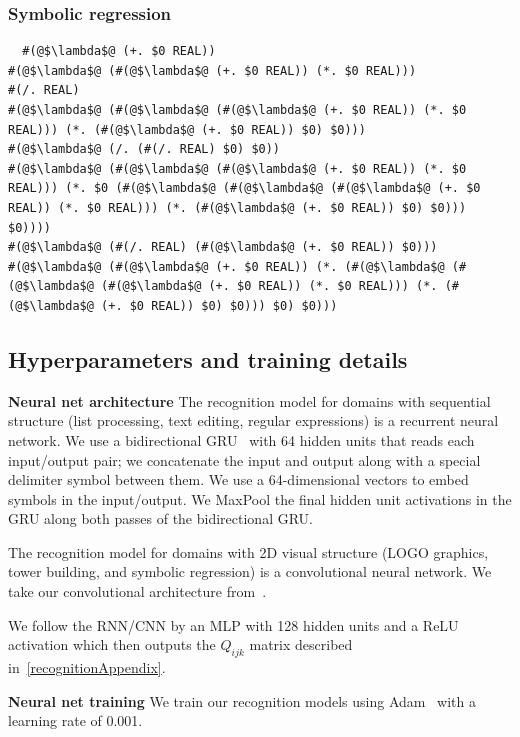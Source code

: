 \documentclass{article}
\begin{document}
\subsubsection{Symbolic regression}
\begin{lstlisting}
  #(@$\lambda$@ (+. $0 REAL))
#(@$\lambda$@ (#(@$\lambda$@ (+. $0 REAL)) (*. $0 REAL)))
#(/. REAL)
#(@$\lambda$@ (#(@$\lambda$@ (#(@$\lambda$@ (+. $0 REAL)) (*. $0 REAL))) (*. (#(@$\lambda$@ (+. $0 REAL)) $0) $0)))
#(@$\lambda$@ (/. (#(/. REAL) $0) $0))
#(@$\lambda$@ (#(@$\lambda$@ (#(@$\lambda$@ (+. $0 REAL)) (*. $0 REAL))) (*. $0 (#(@$\lambda$@ (#(@$\lambda$@ (#(@$\lambda$@ (+. $0 REAL)) (*. $0 REAL))) (*. (#(@$\lambda$@ (+. $0 REAL)) $0) $0))) $0))))
#(@$\lambda$@ (#(/. REAL) (#(@$\lambda$@ (+. $0 REAL)) $0)))
#(@$\lambda$@ (#(@$\lambda$@ (+. $0 REAL)) (*. (#(@$\lambda$@ (#(@$\lambda$@ (#(@$\lambda$@ (+. $0 REAL)) (*. $0 REAL))) (*. (#(@$\lambda$@ (+. $0 REAL)) $0) $0))) $0) $0)))
\end{lstlisting}

\subsection{Hyperparameters and training details}

\noindent\textbf{Neural net architecture} The recognition model for domains with sequential structure (list processing, text editing, regular expressions) is a
recurrent neural network.
We use a bidirectional GRU~\cite{cho2014learning} with 64 hidden units that reads each input/output pair; we concatenate the input and output along with a special delimiter
symbol between them.
We use a 64-dimensional vectors to embed symbols in the input/output.
We MaxPool the final hidden unit activations in the GRU along both passes of the bidirectional GRU.

The recognition model for domains with 2D visual structure (LOGO
graphics, tower building, and symbolic regression) is a convolutional
neural network.
We take our convolutional architecture from~\cite{snell2017prototypical}.

We follow the RNN/CNN by an MLP with 128 hidden units and a ReLU activation which then outputs the $Q_{ijk}$ matrix described in~\ref{recognitionAppendix}.

\noindent\textbf{Neural net training} We train our recognition models using Adam~\cite{kingma2014adam} with a learning rate of 0.001.
\end{document}
